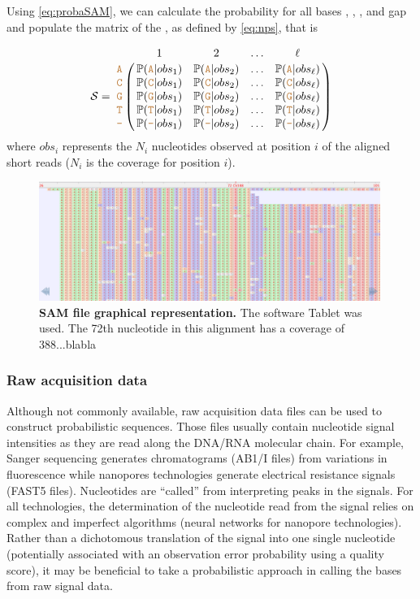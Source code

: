 \documentclass[10pt]{article}
\begin{document}
Using \autoref{eq:probaSAM}, we can calculate the probability for all bases , , ,  and gap \sq{-} and populate the matrix of the \nlps, as defined by \autoref{eq:nps}, that is


\begin{equation}
\nps = \bordermatrix{   & 1 & 2 & \ldots & \ell \cr
                \sq{A} & \pr{\sq{A} | obs_1} & \pr{\sq{A} | obs_2} & \ldots & \pr{\sq{A} | obs_\ell} \cr
                \sq{C} & \pr{\sq{C} | obs_1} & \pr{\sq{C} | obs_2} & \ldots & \pr{\sq{C} | obs_\ell} \cr
                \sq{G} & \pr{\sq{G} | obs_1} & \pr{\sq{G} | obs_2} & \ldots & \pr{\sq{G} | obs_\ell} \cr
                \sq{T} & \pr{\sq{T} | obs_1} & \pr{\sq{T} | obs_2} & \ldots & \pr{\sq{T} | obs_\ell} \cr 
                \sq{-} & \pr{\sq{-} | obs_1} & \pr{\sq{-} | obs_2} & \ldots & \pr{\sq{-} | obs_\ell} \cr 
}\label{eq:npsSAM}
\end{equation}
where $obs_i$ represents the $N_i$ nucleotides observed at position $i$ of the aligned short reads (\ie $N_i$ is the coverage for position $i$).


\begin{figure}[ht]
\centering
    \includegraphics[width=0.99\textwidth]{figs/sam-tablet.png}
\caption{\textbf{SAM file graphical representation.} The software Tablet  was used. The 72th nucleotide in this alignment has a coverage of 388...blabla}
\label{fig:sam}
\end{figure}


\subsubsection{Raw acquisition data}


Although not commonly available, raw acquisition data files can be used to construct probabilistic sequences. Those files usually contain nucleotide signal intensities  as they are read along the DNA/RNA molecular chain. 
For example, Sanger sequencing generates chromatograms (AB1/I files) from variations in fluorescence while nanopores technologies generate electrical resistance signals (FAST5 files). 
Nucleotides are ``called'' from interpreting peaks in the signals. For all technologies, the determination of the nucleotide read from the signal relies on complex and imperfect algorithms (\eg neural networks for nanopore technologies). Rather than a dichotomous translation of the signal into one single nucleotide (potentially associated with an observation error probability using a quality score), it may be beneficial to take a probabilistic approach in calling the bases from raw signal data. 
\end{document}
